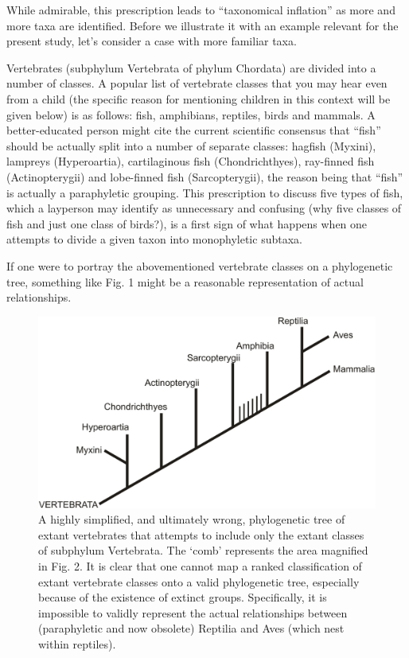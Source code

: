 \begin{artengenv}
While admirable, this prescription leads to ``taxonomical inflation'' as more and more taxa are identified. Before we
illustrate it with an example relevant for the present study, let’s consider a case with more familiar taxa.

Vertebrates (subphylum Vertebrata of phylum Chordata) are divided into a number of classes. A popular list of vertebrate
classes that you may hear even from a child (the specific reason for mentioning children in this context will be given
below) is as follows: fish, amphibians, reptiles, birds and mammals. A better-educated person might cite the current
scientific consensus that ``fish'' should be actually split into a number of separate classes: hagfish (Myxini), lampreys
(Hyperoartia), cartilaginous fish (Chondrichthyes), ray-finned fish (Actinopterygii) and lobe-finned fish
(Sarcopterygii), the reason being that ``fish'' is actually a paraphyletic grouping. This prescription to discuss five
types of fish, which a layperson may identify as unnecessary and confusing (why five classes of fish and just one class
of birds?), is a first sign of what happens when one attempts to divide a given taxon into monophyletic subtaxa.

If one were to portray the abovementioned vertebrate classes on a phylogenetic tree, something like Fig. 1 might be a
reasonable representation of actual relationships.

\begin{figure}[h]
	\centering
	\includegraphics[width=1\textwidth]{PAU_Lamza/Lamzaorg-img001.pdf}
	\caption{A highly simplified, and ultimately wrong, phylogenetic tree of extant vertebrates that attempts to
		include only the extant classes of subphylum Vertebrata. The ‘comb’ represents the area magnified in Fig. 2. It is
		clear that one cannot map a ranked classification of extant vertebrate classes onto a valid phylogenetic tree,
		especially because of the existence of extinct groups. Specifically, it is impossible to validly represent the actual
		relationships between (paraphyletic and now obsolete) Reptilia and Aves (which nest within reptiles).}
\end{figure}


\end{artengenv}

